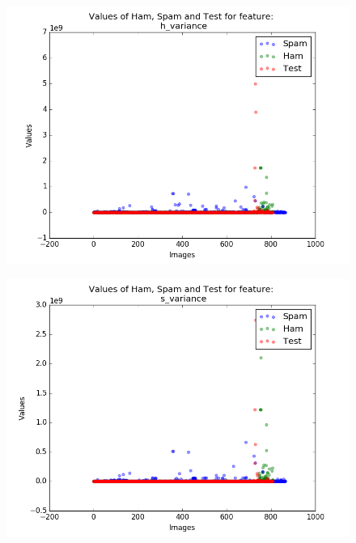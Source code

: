 \begin{figure}[h]
	\centering
	\begin{minipage}{.5\textwidth}
		\centering
		\includegraphics[width=\linewidth]{images/appA/h_variance_values_scatter}
		\label{fig:h_variance_values_scatter}
	\end{minipage}%
	\begin{minipage}{.5\textwidth}
		\centering
		\includegraphics[width=\linewidth]{images/appA/s_variance_values_scatter}
		\label{fig:s_variance_values_scatter}
	\end{minipage}
\end{figure}


